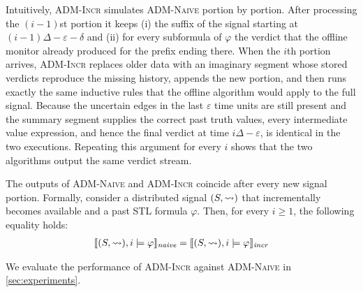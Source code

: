 Intuitively, \textsc{ADM-Incr} simulates \textsc{ADM-Naive} portion by portion.
After processing the $(i-1)$st portion it keeps (i) the suffix of the signal starting at $(i-1)\Delta - \varepsilon - \delta$ and (ii) for every subformula of $\varphi$ the verdict that the offline monitor already produced for the prefix ending there.
When the $i$th portion arrives, \textsc{ADM-Incr} replaces older data with an imaginary segment whose stored verdicts reproduce the missing history, appends the new portion, and then runs exactly the same inductive rules that the offline algorithm would apply to the full signal.
Because the uncertain edges in the last $\varepsilon$ time units are still present and the summary segment supplies the correct past truth values, every intermediate value expression, and hence the final verdict at time $i\Delta - \varepsilon$, is identical in the two executions.
Repeating this argument for every $i$ shows that the two algorithms output the same verdict stream.

\begin{theorem} \label{cl:algoOnline}
	The outputs of \textsc{ADM-Naive} and \textsc{ADM-Incr} coincide after every new signal portion.
	Formally, consider a distributed signal $(S,{\rightsquigarrow})$ that incrementally becomes available and a past STL formula $\varphi$.
	Then, for every $i \geq 1$, the following equality holds:
	\begin{align*}
		\llbracket (S, {\rightsquigarrow}), i \models \varphi \rrbracket_{\textit{naive}} = \llbracket (S, {\rightsquigarrow}), i \models \varphi \rrbracket_{\textit{incr}}
	\end{align*}
\end{theorem}

We evaluate the performance of \textsc{ADM-Incr} against \textsc{ADM-Naive} in \cref{sec:experiments}.
\egroup





